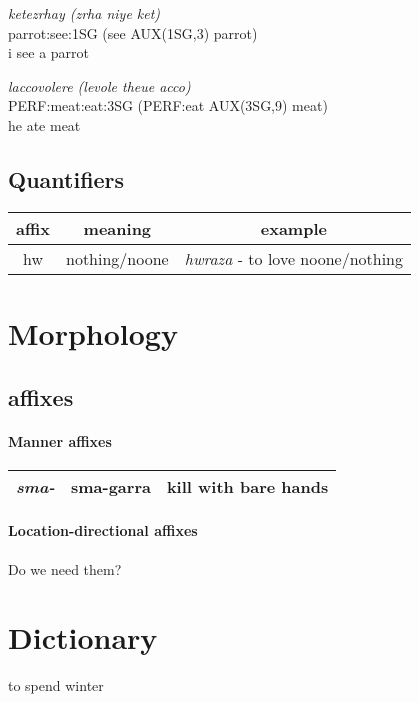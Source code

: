 \documentclass[11pt]{book}
\begin{document}
\begin{exe}
\ex 
\gll \textit{ketezrhay (zrha niye ket)} \\
  parrot:see:1SG (see AUX(1SG,3) parrot) \\
\trans i see a parrot

\ex 
\gll \textit{laccovolere (levole theue acco)} \\
  PERF:meat:eat:3SG (PERF:eat AUX(3SG,9) meat) \\
\trans he ate meat
\end{exe}

\subsection{Quantifiers}

\begin{center}
\begin{tabular}{c | c | c}
affix & meaning & example \\ \hline
hw & nothing/noone & \textit{hwraza} - to love noone/nothing \\
\end{tabular}
\end{center}


\section{Morphology}
\subsection{affixes}
\paragraph{Manner affixes}
\begin{center}
\begin{tabular}{| c | c | c |}
  \hline
  \textit{sma-} & sma-garra & kill with bare hands \\ \hline
\end{tabular}
\end{center}

\paragraph{Location-directional affixes} Do we need them?

\section{Dictionary}
\begin{multicols}{2}
  \begin{description}
  \item [inha]
  	\begin{enumerate*}
  		 {to spend winter}
  	\end{enumerate*}
  
  \end{description}
\end{multicols}
\end{document}
